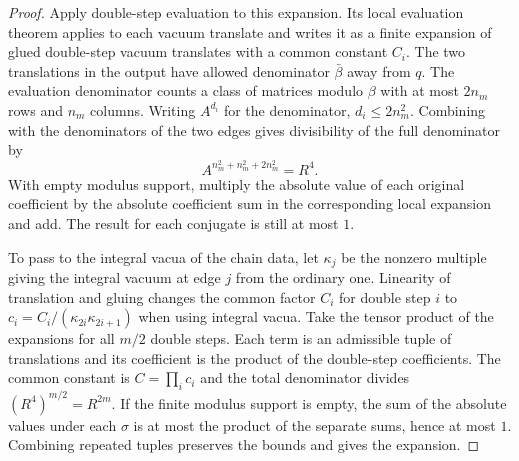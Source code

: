 \begin{proof}
Apply double-step evaluation to this expansion. Its local evaluation theorem applies to each vacuum translate and writes it as a finite expansion of glued double-step vacuum translates with a common constant $C_i$. The two translations in the output have allowed denominator $\bar\beta$ away from $q$. The evaluation denominator counts a class of matrices modulo $\beta$ with at most $2n_m$ rows and $n_m$ columns. Writing $A^{d_i}$ for the denominator, $d_i\le2n_m^2$. Combining with the denominators of the two edges gives divisibility of the full denominator by
\[
 A^{n_m^2+n_m^2+2n_m^2}=R^4 .
\]
With empty modulus support, multiply the absolute value of each original coefficient by the absolute coefficient sum in the corresponding local expansion and add. The result for each conjugate is still at most $1$.

To pass to the integral vacua of the chain data, let $\kappa_j$ be the nonzero multiple giving the integral vacuum at edge $j$ from the ordinary one. Linearity of translation and gluing changes the common factor $C_i$ for double step $i$ to $c_i=C_i/(\kappa_{2i}\kappa_{2i+1})$ when using integral vacua. Take the tensor product of the expansions for all $m/2$ double steps. Each term is an admissible tuple of translations and its coefficient is the product of the double-step coefficients. The common constant is $C=\prod_i c_i$ and the total denominator divides $(R^4)^{m/2}=R^{2m}$. If the finite modulus support is empty, the sum of the absolute values under each $\sigma$ is at most the product of the separate sums, hence at most $1$. Combining repeated tuples preserves the bounds and gives the expansion.
\end{proof}

